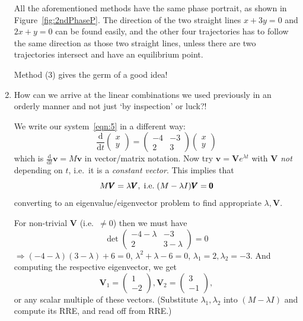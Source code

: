\documentclass[12pt]{report}
\theoremstyle{definition}
\begin{document}
\begin{enumerate}[label = (\arabic*)]
    All the aforementioned methods have the same phase portrait, as shown in Figure~\ref{fig:2ndPhaseP}.
    The direction of the two straight lines $x + 3y = 0$ and $2x + y = 0$ can be found easily,
    and the other four trajectories has to follow the same direction as those two straight lines,
    unless there are two trajectories intersect and have an equilibrium point.

    Method (3) gives the germ of a good idea!

\item How can we arrive at the linear combinations we used previously in an orderly manner
    and not just `by inspection' or luck?!

    We write our system~\eqref{eqn:5} in a different way:
    \begin{equation}\label{eqn:6}
        \frac{\mathrm{d}}{\mathrm{d}t} \begin{pmatrix}
                x \\
                y
        \end{pmatrix} = \begin{pmatrix}
        -4 & -3 \\
        2 & 3
        \end{pmatrix} \begin{pmatrix}
                x \\
                y
        \end{pmatrix} 
    \end{equation}
      which is $\frac{\mathrm{d}}{\mathrm{d}t} \pmb{v} = M\pmb{v}$ in vector/matrix notation.
      Now try $\pmb{v} = \pmb{V}e^{\lambda t}$ with $\pmb{V}$ \emph{not} depending on $t$,
      i.e.\ it is a \emph{constant vector}. This implies that\[
          M\pmb{V} = \lambda \pmb{V}, \;\textnormal{i.e.}\; (M - \lambda I)\pmb{V} = \pmb{0}
      \]converting to an eigenvalue/eigenvector problem to find appropriate $\lambda, \pmb{V}$.

      For non-trivial $\pmb{V}$ (i.e.\ $\neq 0$) then we must have\[
          \det{
          \begin{pmatrix}
              -4-\lambda & -3 \\
              2 & 3-\lambda
          \end{pmatrix} 
      } = 0
      \]
      $\Rightarrow{}(-4-\lambda)(3-\lambda)+6 = 0$, $\lambda^{2}+\lambda-6 = 0$,
      $\lambda_1 = 2, \lambda_2 = -3$.
      And computing the respective eigenvector, we get
      \[\pmb{V}_1 = \begin{pmatrix}
              1 \\
              -2
      \end{pmatrix} , \pmb{V}_2 = \begin{pmatrix}
              3 \\
              -1
          \end{pmatrix} ,\] or any scalar multiple of these vectors.
      (Substitute $\lambda_1, \lambda_2$ into $(M - \lambda I)$ and compute its RRE,
      and read off from RRE.)


\end{enumerate}
\end{document}
